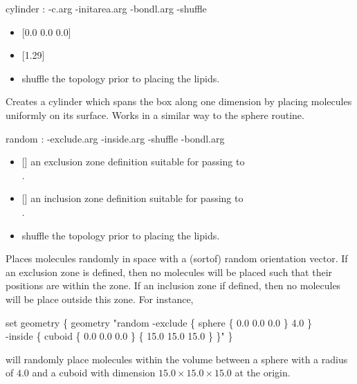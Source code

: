 \begin{code}
  cylinder : -c.arg -initarea.arg -bondl.arg -shuffle
\end{code}
\begin{itemize}
\item {} [{0.0 0.0 0.0}]
\item {} [1.29]
\item {} shuffle the topology prior to placing the lipids.
\end{itemize}
Creates a cylinder which spans the box along one dimension by placing molecules uniformly on its surface. Works in a similar way to the sphere routine.

\begin{code}
  random : -exclude.arg -inside.arg -shuffle -bondl.arg
\end{code}
\begin{itemize}
  \item {} [] an exclusion zone definition suitable for passing to\\
 .
  \item {} [] an inclusion zone definition suitable for passing to\\
 .
  \item {} shuffle the topology prior to placing the lipids.
  \end{itemize}
Places molecules randomly in space with a (sortof) random orientation vector. If an exclusion zone is defined, then no molecules will be placed such that their positions are within the zone. If an inclusion zone if defined, then no molecules will be place outside this zone. For instance,
\begin{code}
  set geometry \{ geometry "random -exclude \{ sphere \{ 0.0 0.0 0.0 \} 4.0 \}\\
                -inside \{ cuboid \{ 0.0 0.0 0.0 \} \{ 15.0 15.0 15.0 \} \}" \}\\
\end{code}
will randomly place molecules within the volume between a sphere with a radius of $4.0$ and a cuboid with dimension $15.0 \times 15.0 \times 15.0 $ at the origin.


